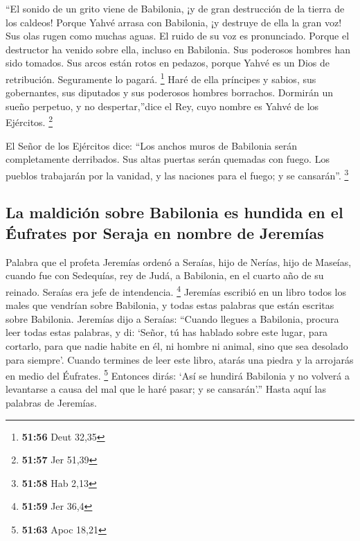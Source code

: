 ``El sonido de un grito viene de Babilonia, ¡y de gran
destrucción de la tierra de los caldeos!  Porque Yahvé
arrasa con Babilonia, ¡y destruye de ella la gran voz! Sus olas rugen
como muchas aguas. El ruido de su voz es pronunciado. 
Porque el destructor ha venido sobre ella, incluso en Babilonia. Sus
poderosos hombres han sido tomados. Sus arcos están rotos en pedazos,
porque Yahvé es un Dios de retribución. Seguramente lo pagará.
\footnote{\textbf{51:56} Deut 32,35}  Haré de ella
príncipes y sabios, sus gobernantes, sus diputados y sus poderosos
hombres borrachos. Dormirán un sueño perpetuo, y no despertar,''dice el
Rey, cuyo nombre es Yahvé de los Ejércitos. \footnote{\textbf{51:57} Jer
  51,39}

 El Señor de los Ejércitos dice: ``Los anchos muros de
Babilonia serán completamente derribados. Sus altas puertas serán
quemadas con fuego. Los pueblos trabajarán por la vanidad, y las
naciones para el fuego; y se cansarán''. \footnote{\textbf{51:58} Hab
  2,13}

\hypertarget{la-maldiciuxf3n-sobre-babilonia-es-hundida-en-el-uxe9ufrates-por-seraja-en-nombre-de-jeremuxedas}{%
\subsection{La maldición sobre Babilonia es hundida en el Éufrates por
Seraja en nombre de
Jeremías}\label{la-maldiciuxf3n-sobre-babilonia-es-hundida-en-el-uxe9ufrates-por-seraja-en-nombre-de-jeremuxedas}}

 Palabra que el profeta Jeremías ordenó a Seraías, hijo
de Nerías, hijo de Maseías, cuando fue con Sedequías, rey de Judá, a
Babilonia, en el cuarto año de su reinado. Seraías era jefe de
intendencia. \footnote{\textbf{51:59} Jer 36,4}  Jeremías
escribió en un libro todos los males que vendrían sobre Babilonia, y
todas estas palabras que están escritas sobre Babilonia. 
Jeremías dijo a Seraías: ``Cuando llegues a Babilonia, procura leer
todas estas palabras,  y di: `Señor, tú has hablado sobre
este lugar, para cortarlo, para que nadie habite en él, ni hombre ni
animal, sino que sea desolado para siempre'.  Cuando
termines de leer este libro, atarás una piedra y la arrojarás en medio
del Éufrates. \footnote{\textbf{51:63} Apoc 18,21} 
Entonces dirás: `Así se hundirá Babilonia y no volverá a levantarse a
causa del mal que le haré pasar; y se cansarán'.'' Hasta aquí las
palabras de Jeremías.

